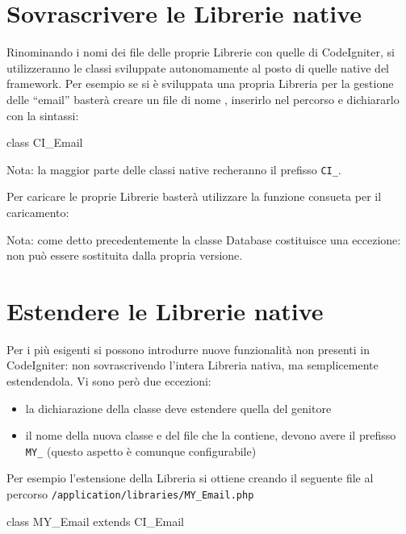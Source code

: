 \section*{Sovrascrivere le Librerie native}
Rinominando i nomi dei file delle proprie Librerie con quelle di CodeIgniter, si utilizzeranno le classi sviluppate autonomamente al posto di quelle native del framework. Per esempio se si è sviluppata una propria Libreria per la gestione delle ``email'' basterà creare un file di nome , inserirlo nel percorso  e dichiararlo con la sintassi:

\begin{code}
class CI_Email {

}
\end{code}

Nota: la maggior parte delle classi native recheranno il prefisso \verb|CI_|.

Per caricare le proprie Librerie basterà utilizzare la funzione consueta per il caricamento:


Nota: come detto precedentemente la classe Database costituisce una eccezione: non può essere sostituita dalla propria versione.

\section*{Estendere le Librerie native}
Per i più esigenti si possono introdurre nuove funzionalità non presenti in CodeIgniter: non sovrascrivendo l'intera Libreria nativa, ma semplicemente estendendola. Vi sono però due eccezioni:

\begin{itemize}
\item la dichiarazione della classe deve estendere quella del genitore
\item  il nome della nuova classe e del file che la contiene, devono avere il prefisso \verb|MY_| (questo aspetto è comunque configurabile)
\end{itemize}

Per esempio l'estensione della Libreria  si ottiene creando il seguente file al percorso \verb|/application/libraries/MY_Email.php|

\begin{code}
class MY_Email extends CI_Email {

}
\end{code}

